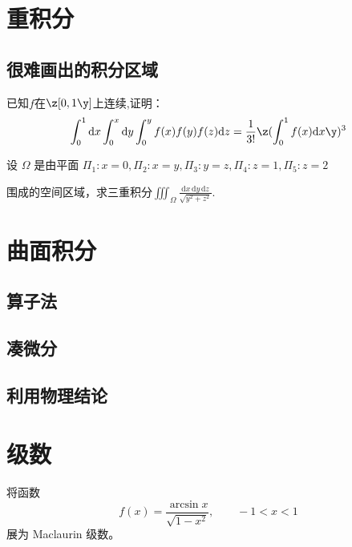 \chapter{重积分}

\section{很难画出的积分区域}

\begin{example}[紫皮书6.2习题]
已知$f$在$\z[0,1\y]$上连续,证明：
\[ \int_{0}^{1}\mathrm{d} x\int_{0}^{x}\mathrm{d} y\int_{0}^{y}f(x)f(y)f(z)\mathrm{d}z = \frac{1}{3!}\z(\int_{0}^{1}f(x)\mathrm{d}x\y)^3\]
\end{example}

\begin{example}[\;17届CMC]
设 \(\Omega\) 是由平面
$\Pi_1 : x = 0, \Pi_2 : x = y, \Pi_3 : y = z, \Pi_4 : z = 1, \Pi_5 : z = 2$

围成的空间区域，求三重积分$\displaystyle \iiint_{\Omega} \frac{\mathrm{d} x \, \mathrm{d} y\, \mathrm{d} z}{\sqrt{y^2 + z^2}}.$

\end{example}



\chapter{曲面积分}

\section{算子法}

\section{凑微分}

\section{利用物理结论}




\chapter{级数}

\begin{example}
将函数
\[
f(x)=\frac{\arcsin x}{\sqrt{1-x^2}},\qquad -1<x<1
\]
展为 Maclaurin 级数。
\end{example}

